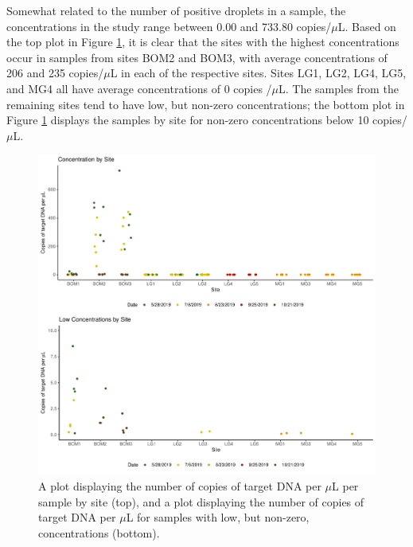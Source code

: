\documentclass[12pt]{article}\usepackage[]{graphicx}\usepackage[]{color}
\makeatletter
\def\maxwidth{ %
  \ifdim\Gin@nat@width>\linewidth
    \linewidth
  \else
    \Gin@nat@width
  \fi
}
\newenvironment{knitrout}{}{} %
\def\maxwidth{ %
  \ifdim\Gin@nat@width>\linewidth
    \linewidth
  \else
    \Gin@nat@width
  \fi
}
\newenvironment{knitrout}{}{} %
\makeatother
\begin{document}
Somewhat related to the number of positive droplets in a sample, the concentrations in the study range between 0.00 and 733.80 copies/$\mu$L. Based on the top plot in Figure \ref{fig:eDNA_concentration}, it is clear that the sites with the highest concentrations occur in samples from sites BOM2 and BOM3, with average concentrations of 206 and 235 copies/$\mu$L in each of the respective sites. Sites LG1, LG2, LG4, LG5, and MG4 all have average concentrations of 0 copies /$\mu$L. The samples from the remaining sites tend to have low, but non-zero concentrations; the bottom plot in Figure \ref{fig:eDNA_concentration} displays the samples by site for non-zero concentrations below 10 copies/$\mu$L.  



\begin{figure}[]
\begin{knitrout}
\color{fgcolor}

{\centering \includegraphics[width=\maxwidth]{figure/eDNA_visualization_concentration-1} 

}



\end{knitrout}
\caption{A plot displaying the number of copies of target DNA per $\mu$L per sample by site (top), and a plot displaying the number of copies of target DNA per $\mu$L for samples with low, but non-zero, concentrations (bottom).}
\label{fig:eDNA_concentration}
\end{figure}
\end{document}
